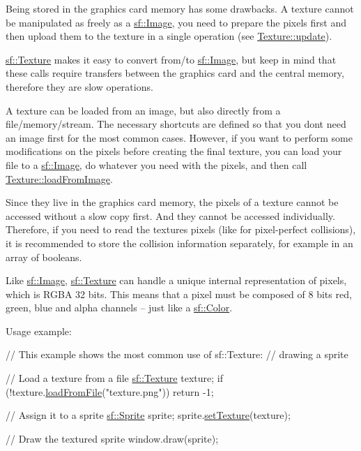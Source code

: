 Being stored in the graphics card memory has some drawbacks. A texture cannot be manipulated as freely as a \hyperlink{classsf_1_1_image}{sf\+::\+Image}, you need to prepare the pixels first and then upload them to the texture in a single operation (see \hyperlink{classsf_1_1_texture_ae4eab5c6781316840b0c50ad08370963}{Texture\+::update}).

\hyperlink{classsf_1_1_texture}{sf\+::\+Texture} makes it easy to convert from/to \hyperlink{classsf_1_1_image}{sf\+::\+Image}, but keep in mind that these calls require transfers between the graphics card and the central memory, therefore they are slow operations.

A texture can be loaded from an image, but also directly from a file/memory/stream. The necessary shortcuts are defined so that you don\textquotesingle{}t need an image first for the most common cases. However, if you want to perform some modifications on the pixels before creating the final texture, you can load your file to a \hyperlink{classsf_1_1_image}{sf\+::\+Image}, do whatever you need with the pixels, and then call \hyperlink{classsf_1_1_texture_abec4567ad9856a3596dc74803f26fba2}{Texture\+::load\+From\+Image}.

Since they live in the graphics card memory, the pixels of a texture cannot be accessed without a slow copy first. And they cannot be accessed individually. Therefore, if you need to read the texture\textquotesingle{}s pixels (like for pixel-\/perfect collisions), it is recommended to store the collision information separately, for example in an array of booleans.

Like \hyperlink{classsf_1_1_image}{sf\+::\+Image}, \hyperlink{classsf_1_1_texture}{sf\+::\+Texture} can handle a unique internal representation of pixels, which is R\+G\+BA 32 bits. This means that a pixel must be composed of 8 bits red, green, blue and alpha channels -- just like a \hyperlink{classsf_1_1_color}{sf\+::\+Color}.

Usage example\+: 
\begin{DoxyCode}
\textcolor{comment}{// This example shows the most common use of sf::Texture:}
\textcolor{comment}{// drawing a sprite}

\textcolor{comment}{// Load a texture from a file}
\hyperlink{classsf_1_1_texture}{sf::Texture} texture;
\textcolor{keywordflow}{if} (!texture.\hyperlink{classsf_1_1_texture_a8e1b56eabfe33e2e0e1cb03712c7fcc7}{loadFromFile}(\textcolor{stringliteral}{"texture.png"}))
    \textcolor{keywordflow}{return} -1;

\textcolor{comment}{// Assign it to a sprite}
\hyperlink{classsf_1_1_sprite}{sf::Sprite} sprite;
sprite.\hyperlink{classsf_1_1_sprite_a3729c88d88ac38c19317c18e87242560}{setTexture}(texture);

\textcolor{comment}{// Draw the textured sprite}
window.draw(sprite);
\end{DoxyCode}




